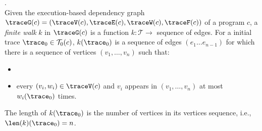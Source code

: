 \begin{defn}.
    \label{def:finitewalk}
    \\
    Given the execution-based dependency graph $\traceG({c}) = (\traceV({c}), \traceE({c}), \traceW({c}), \traceF({c}))$ of a program $c$,
    a \emph{finite walk} $k$ in $\traceG({c})$ is a 
    function $k: \mathcal{T} \to $ sequence of edges.
    For a initial trace $\trace_0 \in \mathcal{T}_0(c)$, 
    $k(\trace_0)$ is a sequence of edges $(e_1 \ldots e_{n - 1})$ 
    for which there is a sequence of vertices 
    $(v_1, \ldots, v_{n})$ such that:
    \begin{itemize}
        \item {}
        \item every $(v_i, w_i) \in \traceV(c)$
         and $v_i$ appears in $(v_1, \ldots, v_{n})$ at most 
      $w_i(\trace_0)$
        times.  
    \end{itemize}
    The length of $k(\trace_0)$ is the number of vertices in its vertices sequence, i.e., $\len(k)(\trace_0) = n$.
   \end{defn}
  
